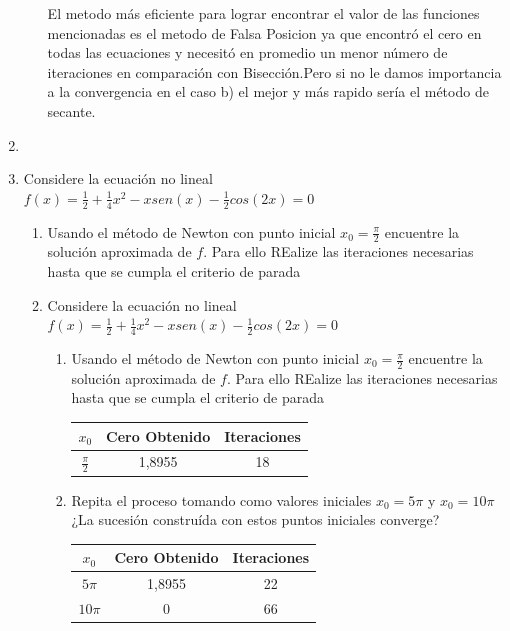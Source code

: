 \documentclass{udparticle}
\begin{document}
\begin{enumerate}
\begin{enumerate}
El metodo más eficiente para lograr encontrar el valor de las funciones mencionadas es el metodo de Falsa Posicion ya que encontró el cero en todas las ecuaciones y necesitó en promedio un menor número de iteraciones en comparación con Bisección.Pero si no le damos importancia a la convergencia en el caso b) el mejor y más rapido sería el método de secante.

\end{enumerate}
\newpage
\item %
\newpage
\item Considere la ecuación no lineal $f(x)= \frac{1}{2}+\frac{1}{4}x^2-xsen(x)-\frac{1}{2}cos(2x)=0$
	\begin{enumerate}
	\item  Usando el método de Newton con punto inicial $x_{0}=\frac{\pi}{2}$ encuentre la solución aproximada de $f$. Para ello REalize las iteraciones necesarias hasta que se cumpla el criterio de parada %

\item Considere la ecuación no lineal $f(x)= \frac{1}{2}+\frac{1}{4}x^2-xsen(x)-\frac{1}{2}cos(2x)=0$
	\begin{enumerate}
	\item  Usando el método de Newton con punto inicial $x_{0}=\frac{\pi}{2}$ encuentre la solución aproximada de $f$. Para ello REalize las iteraciones necesarias hasta que se cumpla el criterio de parada %

		\begin{table} [H]
			\centering
			\begin{tabular}{|c|c|c|}
				\hline
				$x_{0}$ & Cero Obtenido & Iteraciones\\
				\hline
				$\frac{\pi}{2} $ & 1,8955 & 18\\
				\hline 
			\end{tabular}
		\end{table}
	
	\item Repita el proceso tomando como valores iniciales $x_{0}=5\pi$ y $x_{0}=10\pi$ ¿La sucesión construída con estos puntos iniciales converge?
	 	\begin{table} [H]
			\centering
			\begin{tabular}{|c|c|c|}
				\hline
				$x_{0}$ & Cero Obtenido & Iteraciones\\
				\hline
				$5\pi$ & 1,8955 & 22 \\
				\hline 
				$10\pi$ & 0 & 66\\
				\hline
			\end{tabular}
		\end{table}
		

\end{enumerate}
\end{enumerate}
\end{enumerate}
\end{document}
